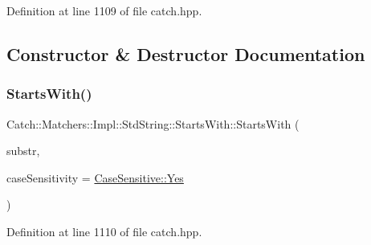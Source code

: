 Definition at line 1109 of file catch.\+hpp.



\subsection{Constructor \& Destructor Documentation}
\hypertarget{struct_catch_1_1_matchers_1_1_impl_1_1_std_string_1_1_starts_with_a0db1bd8876219464ae60346c9525bcf6}{}\label{struct_catch_1_1_matchers_1_1_impl_1_1_std_string_1_1_starts_with_a0db1bd8876219464ae60346c9525bcf6} 
\subsubsection{\texorpdfstring{Starts\+With()}{StartsWith()}\hspace{0.1cm}{\footnotesize\ttfamily [1/2]}}
{\footnotesize\ttfamily Catch\+::\+Matchers\+::\+Impl\+::\+Std\+String\+::\+Starts\+With\+::\+Starts\+With (\begin{DoxyParamCaption}\item[{std\+::string const \&}]{substr,  }\item[{\hyperlink{struct_catch_1_1_case_sensitive_aad49d3aee2d97066642fffa919685c6a}{Case\+Sensitive\+::\+Choice}}]{case\+Sensitivity = {\ttfamily \hyperlink{struct_catch_1_1_case_sensitive_aad49d3aee2d97066642fffa919685c6aa7c5550b69ec3c502e6f609b67f9613c6}{Case\+Sensitive\+::\+Yes}} }\end{DoxyParamCaption})\hspace{0.3cm}{\ttfamily [inline]}}



Definition at line 1110 of file catch.\+hpp.

\hypertarget{struct_catch_1_1_matchers_1_1_impl_1_1_std_string_1_1_starts_with_a5526cb587632e7e46253d6f60ae01098}{}\label{struct_catch_1_1_matchers_1_1_impl_1_1_std_string_1_1_starts_with_a5526cb587632e7e46253d6f60ae01098} 
